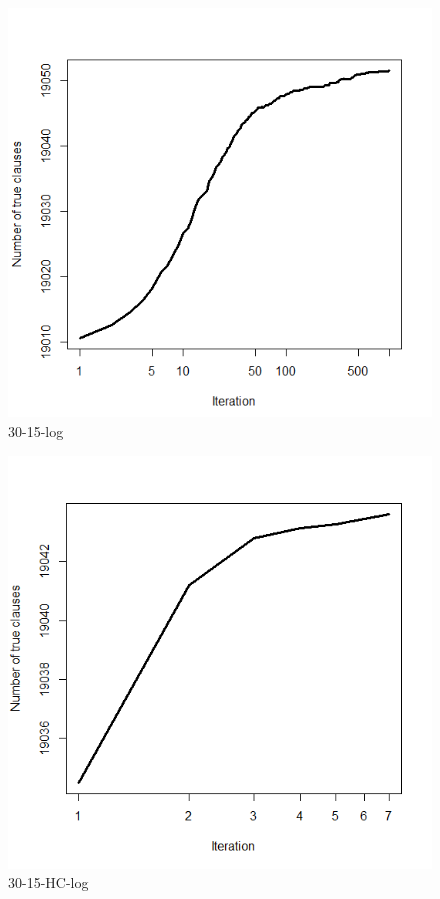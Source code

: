 \documentclass{article}
\begin{document}
\begin{figure}[H]
  \includegraphics[width=\linewidth]{30-15-log.png}
  \caption{30-15-log}
\end{figure}
\begin{figure}[H]
  \includegraphics[width=\linewidth]{30-15-HC-log.png}
  \caption{30-15-HC-log}
\end{figure}
\end{document}
